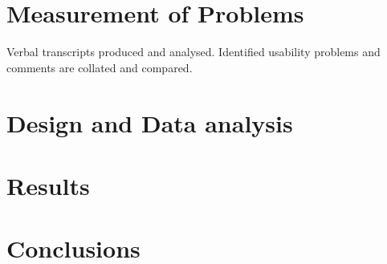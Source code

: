 \section{Measurement of Problems}
Verbal transcripts produced and analysed.  Identified usability problems and comments are collated and compared.

\section{Design and Data analysis}

\section{Results}

\section{Conclusions}





